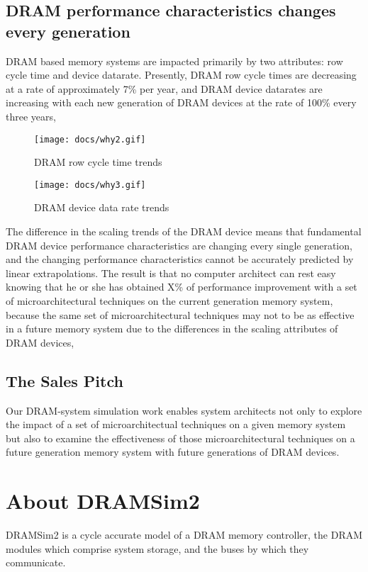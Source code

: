\documentclass[11pt]{article}
\begin{document}
\subsection{DRAM performance characteristics changes every generation}
DRAM based memory systems are impacted primarily by two attributes: 
row cycle time and device datarate. Presently, DRAM row cycle times are 
decreasing at a rate of approximately 7\% per year, and DRAM device
datarates are increasing with each new generation of DRAM devices at the rate
of 100\% every three years, 
\begin{figure}[h]
\begin{center}
\texttt{[image: docs/why2.gif]}
\caption{DRAM row cycle time trends}
\label{classes}
\end{center}
\end{figure}

\begin{figure}[h]
\begin{center}
\texttt{[image: docs/why3.gif]}
\caption{DRAM device data rate trends}
\label{classes}
\end{center}
\end{figure}
The difference in the scaling trends of the DRAM device means that 
fundamental DRAM device performance characteristics are changing 
every single generation, and the changing performance characteristics
cannot be accurately predicted by linear extrapolations. The result is 
that no computer architect can rest easy knowing that he or she has 
obtained X\% of performance improvement with a set of microarchitectural
techniques on the current generation memory system, because the same set 
of microarchitectural techniques may not to be as effective in a 
future memory system due to the differences in the scaling attributes 
of DRAM devices, 

\subsection{The Sales Pitch}
Our DRAM-system simulation work enables system architects not
only to explore the impact of a set of microarchitectual techniques on a 
given memory system but also to examine the effectiveness of those 
microarchitectural techniques on a future generation memory system with
future generations of DRAM devices.

\section{About DRAMSim2}
	DRAMSim2 is a cycle accurate model of a DRAM memory controller, the DRAM
	modules which comprise system storage, and the buses by which they
	communicate. 
\end{document}
